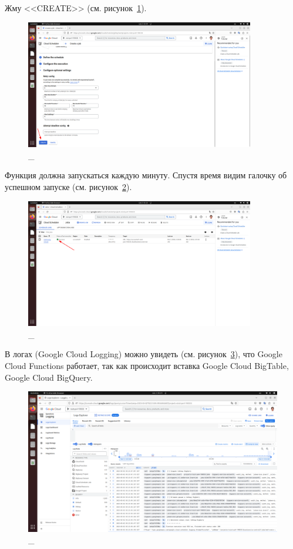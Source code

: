 \documentclass[12pt, a4paper, simple]{eskdtext}
\begin{document}
  Жму <<CREATE>> (см. рисунок~\ref{fig:37}).

  \begin{figure}[!h]
    \centering
    \includegraphics[width=10cm]
    {images/GoogleCloudScheduler/2023-03-02_05-04-46.png}
    \caption{\_}
    \label{fig:37}
  \end{figure}

  Функция должна запускаться каждую минуту. Спустя время видим галочку об успешном запуске (см. рисунок~\ref{fig:38}).

  \begin{figure}[!h]
    \centering
    \includegraphics[width=10cm]
    {images/GoogleCloudScheduler/2023-03-02_05-23-29.png}
    \caption{\_}
    \label{fig:38}
  \end{figure}

  В логах (Google Cloud Logging) можно увидеть (см. рисунок~\ref{fig:39}), что Google Cloud Functions работает,
  так как происходит вставка Google Cloud BigTable, Google Cloud BigQuery.

  \begin{figure}[!h]
    \centering
    \includegraphics[width=16cm]
    {images/GoogleCloudScheduler/2023-03-02_05-24-13.png}
    \caption{\_}
    \label{fig:39}
  \end{figure}
\end{document}
